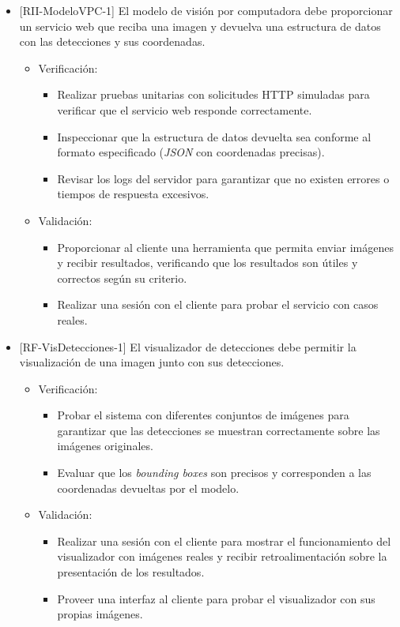 \documentclass[
11pt, %
]{charter}
\begin{document}
\begin{itemize}[label={}]
  \item {[}RII-ModeloVPC-1{]} El modelo de visión por computadora debe proporcionar un servicio web que reciba una imagen y devuelva una estructura de datos con las detecciones y sus coordenadas.
        \begin{itemize}
          \item Verificación:
                \begin{itemize}
                  \item Realizar pruebas unitarias con solicitudes HTTP simuladas para verificar que el servicio web responde correctamente.
                  \item Inspeccionar que la estructura de datos devuelta sea conforme al formato especificado (\textit{JSON} con coordenadas precisas).
                  \item Revisar los logs del servidor para garantizar que no existen errores o tiempos de respuesta excesivos.
                \end{itemize}
          \item Validación:
                \begin{itemize}
                  \item Proporcionar al cliente una herramienta que permita enviar imágenes y recibir resultados, verificando que los resultados son útiles y correctos según su criterio.
                  \item Realizar una sesión con el cliente para probar el servicio con casos reales.
                \end{itemize}
        \end{itemize}

  \item {[}RF-VisDetecciones-1{]} El visualizador de detecciones debe permitir la visualización de una imagen junto con sus detecciones.
        \begin{itemize}
          \item Verificación:
                \begin{itemize}
                  \item Probar el sistema con diferentes conjuntos de imágenes para garantizar que las detecciones se muestran correctamente sobre las imágenes originales.
                  \item Evaluar que los \textit{bounding boxes} son precisos y corresponden a las coordenadas devueltas por el modelo.
                \end{itemize}
          \item Validación:
                \begin{itemize}
                  \item Realizar una sesión con el cliente para mostrar el funcionamiento del visualizador con imágenes reales y recibir retroalimentación sobre la presentación de los resultados.
                  \item Proveer una interfaz al cliente para probar el visualizador con sus propias imágenes.
                \end{itemize}
        \end{itemize}


\end{itemize}
\end{document}
